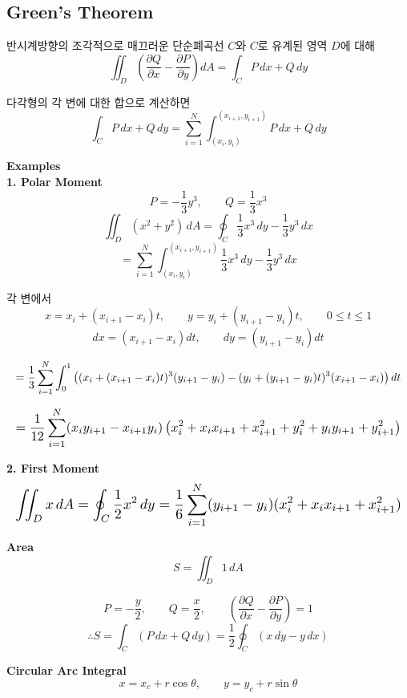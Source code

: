 \subsection{Green's Theorem}

반시계방향의 조각적으로 매끄러운 단순폐곡선 $C$와 $C$로 유계된 영역 $D$에 대해
\[
\iint_D \left( \frac{\partial Q}{\partial x} - \frac{\partial P}{\partial y} \right)dA
=
\int_C P\,dx+Q\,dy
\]

다각형의 각 변에 대한 합으로 계산하면
\[
\int_C P\,dx+Q\,dy
=
\sum_{i=1}^{N}
\int_{(x_i,y_i)}^{(x_{i+1},y_{i+1})}
P\,dx+Q\,dy
\]

\vspace{5pt}
\noindent \textbf{Examples} \\

\noindent \textbf{1. Polar Moment} \\
\[
P=-\frac{1}{3}y^3,\qquad Q=\frac{1}{3}x^3
\]
\[
\iint_D (x^2+y^2)\,dA
=
\oint_C \frac{1}{3}x^3\,dy-\frac{1}{3}y^3\,dx
\]
\[
=
\sum_{i=1}^{N}
\int_{(x_i,y_i)}^{(x_{i+1},y_{i+1})}
\frac{1}{3}x^3\,dy-\frac{1}{3}y^3\,dx
\]

각 변에서
\[
x=x_i+(x_{i+1}-x_i)t,\qquad
y=y_i+(y_{i+1}-y_i)t,\qquad 0\le t\le 1
\]
\[
dx=(x_{i+1}-x_i)dt,\qquad
dy=(y_{i+1}-y_i)dt
\]

\[
\resizebox{\linewidth}{!}{$\displaystyle
=
\frac{1}{3}
\sum_{i=1}^{N}
\int_0^1
\left(
(x_i+(x_{i+1}-x_i)t)^3(y_{i+1}-y_i)
-
(y_i+(y_{i+1}-y_i)t)^3(x_{i+1}-x_i)
\right)dt
$}
\]

\[
\resizebox{\linewidth}{!}{$\displaystyle
=
\frac{1}{12}
\sum_{i=1}^{N}
(x_i y_{i+1}-x_{i+1}y_i)
\left(
x_i^2+x_i x_{i+1}+x_{i+1}^2
+
y_i^2+y_i y_{i+1}+y_{i+1}^2
\right)
$}
\]

\vspace{5pt}
\noindent \textbf{2. First Moment} \\
\[
\resizebox{\linewidth}{!}{$\displaystyle
\iint_D x\,dA
=
\oint_C \frac{1}{2}x^2\,dy
=
\frac{1}{6}
\sum_{i=1}^{N}
(y_{i+1}-y_i)
(x_i^2+x_i x_{i+1}+x_{i+1}^2)
$}
\]

\vspace{5pt}
\noindent \textbf{Area} \\
\[
S=\iint_D 1\,dA
\]

\[
P=-\frac{y}{2},\qquad Q=\frac{x}{2},
\qquad
\left(
\frac{\partial Q}{\partial x}
-
\frac{\partial P}{\partial y}
\right)=1
\]
\[
\therefore
S
=
\int_C (P\,dx+Q\,dy)
=
\frac{1}{2}\oint_C (x\,dy-y\,dx)
\]

\vspace{5pt}
\noindent \textbf{Circular Arc Integral} \\
\[
x=x_c+r\cos\theta,\qquad y=y_c+r\sin\theta
\]

